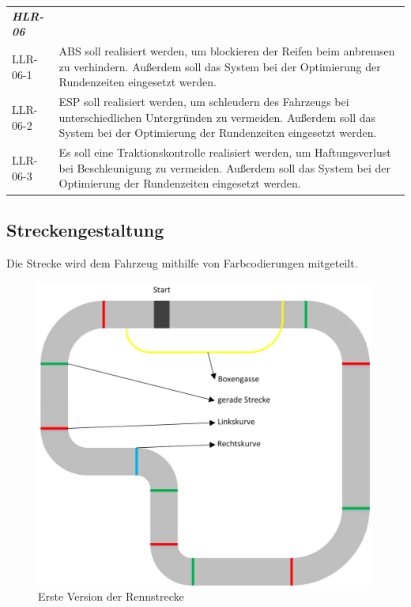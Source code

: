 \documentclass[a4paper,12pt]{article}                                         %
\numberwithin{table}{section}                               %
\numberwithin{figure}{section}                              %
\begin{document}
	\begin{tabular}{ l | p{} }
	\textbf{\textit{HLR-06}} & \\
	LLR-06-1 &
	ABS soll realisiert werden, um blockieren der Reifen beim anbremsen zu verhindern. Außerdem soll das System bei der Optimierung der Rundenzeiten eingesetzt werden.\\
	LLR-06-2 &
	ESP soll realisiert werden, um schleudern des Fahrzeugs bei unterschiedlichen Untergründen zu vermeiden. Außerdem soll das System bei der Optimierung der Rundenzeiten eingesetzt werden.\\
	LLR-06-3 &
	Es soll eine Traktionskontrolle realisiert werden, um Haftungsverlust bei Beschleunigung zu vermeiden. Außerdem soll das System bei der Optimierung der Rundenzeiten eingesetzt werden.\\	
	\end{tabular}
	
	\newpage
	\subsection{Streckengestaltung}
	Die Strecke wird dem Fahrzeug mithilfe von Farbcodierungen mitgeteilt.
	
	\begin{figure}[h]
	\begin{center}
				\includegraphics{../Bilder/Rennstrecke}
				\end{center}
				\caption{Erste Version der Rennstrecke} 
			\end{figure}
			
\end{document}
